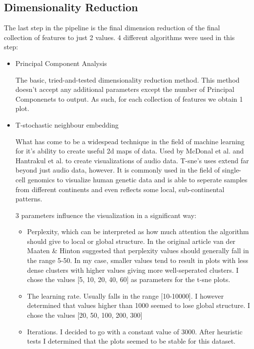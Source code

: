 \documentclass[11pt]{article}
\begin{document}
\subsection{Dimensionality Reduction}
\label{sec:orgfde1e30}

The last step in the pipeline is the final dimension reduction of the final collection of features to just 2 values. 4 different algorithms were used in this step:
\begin{itemize}
\item Principal Component Analysis

The basic, tried-and-tested dimensionality reduction method. This method doesn't accept any additional parameters except the number of Principal Componenets to output. As such, for each collection of features we obtain 1 plot.
\item T-stochastic neighbour embedding

What has come to be a widespead technique in the field of machine learning for it's ability to create useful 2d maps of data. Used by McDonal et al.  and Hantrakul et al. to create visualizations of audio data. T-sne's uses extend far beyond just audio data, however. It is commonly used in the field of single-cell genomics to visualize human genetic data \cite{doi:10.1142/S0219720017500172} and is able to seperate samples from different continents and even reflects some local, sub-continental patterns.

3 parameters influence the visualization in a significant way:
\begin{itemize}
\item Perplexity, which can be interpreted as how much attention the algorithm should give to local or global structure. In the original article van der Maaten \& Hinton suggested that perplexity values should generally fall in the range 5-50. In my case, smaller values tend to result in plots with less dense clusters with higher values giving more well-seperated clusters. I chose the values [5, 10, 20, 40, 60] as parameters for the t-sne plots.
\item The learning rate. Usually falls in the range [10-10000]. I however determined that values higher than 1000 seemed to lose global structure. I chose the values [20, 50, 100, 200, 300]
\item Iterations. I decided to go with a constant value of 3000. After heuristic tests I determined that the plots seemed to be stable for this dataset.
\end{itemize}


\end{itemize}
\end{document}
